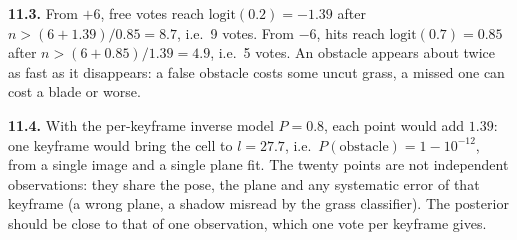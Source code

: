 \textbf{11.3.} From $+6$, free votes reach $\mathrm{logit}(0.2)=-1.39$
after $n>(6+1.39)/0.85=8.7$, i.e.\ 9 votes. From $-6$, hits reach
$\mathrm{logit}(0.7)=0.85$ after $n>(6+0.85)/1.39=4.9$, i.e.\ 5 votes.
An obstacle appears about twice as fast as it disappears: a false
obstacle costs some uncut grass, a missed one can cost a blade or worse.

\textbf{11.4.} With the per-keyframe inverse model $P=0.8$, each point
would add $1.39$: one keyframe would bring the cell to $l=27.7$, i.e.\
$P(\text{obstacle})=1-10^{-12}$, from a single image and a single plane
fit. The twenty points are not independent observations: they share
the pose, the plane and any systematic error of that keyframe (a wrong
plane, a shadow misread by the grass classifier). The posterior should
be close to that of one observation, which one vote per keyframe gives.
